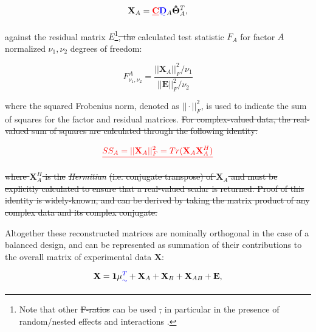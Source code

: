 \documentclass[preprint,12pt]{elsarticle}
\providecommand{\DIFadd}[1]{{\protect\color{blue}\uwave{#1}}} %
\providecommand{\DIFdel}[1]{{\protect\color{red}\sout{#1}}}                      %
\providecommand{\DIFaddbegin}{} %
\providecommand{\DIFaddend}{} %
\providecommand{\DIFdelbegin}{} %
\providecommand{\DIFdelend}{} %
\begin{document}
\begin{equation}\label{eq:rec}
    \mathbf{X}_A = \DIFdelbegin \DIFdel{\mathbf{C}}\DIFdelend \DIFaddbegin \DIFadd{\mathbf{D}}\DIFaddend _A\mathbf{\hat{\Theta}}^T_A,
\end{equation}

\noindent against the residual matrix $E$\footnote{Note that other \DIFdelbegin \DIFdel{F-ratios }\DIFdelend \DIFaddbegin \DIFadd{$F$-ratios }\DIFaddend can be used \DIFdelbegin \DIFdel{, }\DIFdelend in particular in the presence of random/nested effects and interactions \cite{anderson2014permutational}.}\DIFdelbegin \DIFdel{, the }\DIFdelend \DIFaddbegin \DIFadd{. The }\DIFaddend calculated test statistic $F_A$ for factor $A$ normalized \DIFaddbegin \DIFadd{for }\DIFaddend $\nu_1, \nu_2$ degrees of freedom:

 \begin{equation}\label{eq:sig_test}
    F^A_{\nu_1,\nu_2} = \frac{||\mathbf{X}_A||_F^2/\nu_1}{||\mathbf{E}||^2_F/\nu_2}
\end{equation}

\noindent where the squared Frobenius norm, denoted as $||\cdot||^2_F$, is used to indicate the sum of squares for the factor and residual matrices. \DIFdelbegin \DIFdel{For complex-valued data, the real-valued sum of squares are calculated through the following identity:
}%

\begin{displaymath}\DIFdel{%
    SS_A = ||\mathbf{X}_A||^2_F = Tr(\mathbf{X}_A\mathbf{X}_A^H)
}\end{displaymath}%

\DIFdel{where $\mathbf{X}^H_A$ is the }\textit{\DIFdel{Hermitian}} %
\DIFdel{(i.e. conjugate transpose) of $\mathbf{X}_A$ and must be explicitly calculated to ensure that a real-valued scalar is returned. Proof of this identity is widely-known, and can be derived by taking the matrix product of any complex data and its complex conjugate.
}%

\DIFdelend Altogether these reconstructed matrices are nominally orthogonal in the case of a balanced design, and can be represented as summation of their contributions to the overall matrix of experimental data $\mathbf{X}$:

\begin{equation}
    \mathbf{X} = \mathbf{1}\mu\DIFaddbegin \DIFadd{^T }\DIFaddend + \mathbf{X}_A + \mathbf{X}_B + \mathbf{X}_{AB} + \mathbf{E},
\end{equation}
\end{document}
